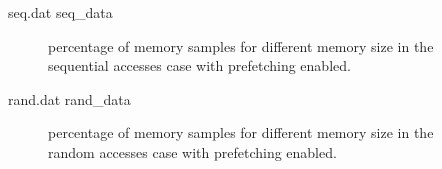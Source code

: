 \documentclass[10pt,a4paper]{article}
\begin{document}
\begin{filecontents}{seq.dat}
  seq_data
\end{filecontents}

\begin{figure}[h]
  \caption{percentage of memory samples for different memory size in the sequential
    accesses case with prefetching enabled.}
\end{figure}

\begin{filecontents}{rand.dat}
  rand_data
\end{filecontents}

\begin{figure}[h]
  \caption{percentage of memory samples for different memory size in the random
    accesses case with prefetching enabled.}
\end{figure}
\end{document}
